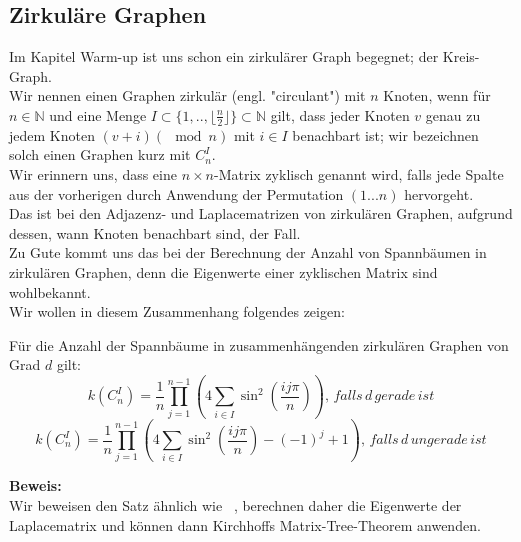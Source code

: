 \subsection{Zirkuläre Graphen}
Im Kapitel Warm-up ist uns schon ein zirkulärer Graph begegnet; der Kreis-Graph.\\
Wir nennen einen Graphen zirkulär (engl. "circulant") mit $n$ Knoten, wenn für $n \in \mathbb{N}$ und eine Menge $I \subset{\{1,..,\lfloor \frac{n}{2} \rfloor \}}\subset{\mathbb{N}}$ gilt, dass jeder Knoten $v$ genau zu jedem Knoten $(v+i) (\mod{n})$ mit $i \in I$ benachbart ist; wir bezeichnen solch einen Graphen kurz mit $C_n^I$.\\
Wir erinnern uns, dass eine $n\times n$-Matrix zyklisch genannt wird, falls jede Spalte aus der vorherigen durch Anwendung der Permutation $(1...n)$ hervorgeht.\\
Das ist bei den Adjazenz- und Laplacematrizen von zirkulären Graphen, aufgrund dessen, wann Knoten benachbart sind, der Fall.\\
Zu Gute kommt uns das bei der Berechnung der Anzahl von Spannbäumen in zirkulären Graphen, denn die Eigenwerte einer zyklischen Matrix sind wohlbekannt.\\
Wir wollen in diesem Zusammenhang folgendes zeigen:
\begin{Tms}
Für die Anzahl der Spannbäume in zusammenhängenden zirkulären Graphen von Grad $d$ gilt:\\
\begin{equation}
\mathit{k}\left( C_n^I \right) = \frac{1}{n} \prod_{j=1}^{n-1} \left(4 \sum_{i \in I} \sin^2 \left( \frac{ij\pi}{n}\right) \right),\,falls\,d\,gerade\,ist
\end{equation}
\begin{equation}
\mathit{k}\left( C_n^I \right) = \frac{1}{n} \prod_{j=1}^{n-1} \left(4 \sum_{i \in I} \sin^2 \left( \frac{ij\pi}{n}\right)-(-1)^j+1\right),\,falls\,d\,ungerade\,ist
\end{equation}
\end{Tms}
\textbf{Beweis:}\\
Wir beweisen den Satz ähnlich wie ~\cite{wang_yang_1984}, berechnen daher die Eigenwerte der Laplacematrix und können dann Kirchhoffs Matrix-Tree-Theorem anwenden.\\
